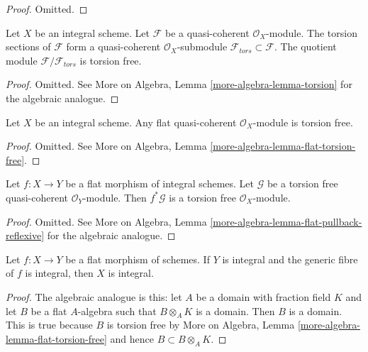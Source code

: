 \begin{proof}
Omitted.
\end{proof}

\begin{lemma}
\label{lemma-torsion}
Let $X$ be an integral scheme. Let $\mathcal{F}$ be a quasi-coherent
$\mathcal{O}_X$-module. The torsion sections of $\mathcal{F}$ form
a quasi-coherent $\mathcal{O}_X$-submodule
$\mathcal{F}_{tors} \subset \mathcal{F}$.
The quotient module $\mathcal{F}/\mathcal{F}_{tors}$ is torsion free.
\end{lemma}

\begin{proof}
Omitted. See More on Algebra, Lemma \ref{more-algebra-lemma-torsion}
for the algebraic analogue.
\end{proof}

\begin{lemma}
\label{lemma-flat-torsion-free}
Let $X$ be an integral scheme. Any flat quasi-coherent $\mathcal{O}_X$-module
is torsion free.
\end{lemma}

\begin{proof}
Omitted. See More on Algebra, Lemma \ref{more-algebra-lemma-flat-torsion-free}.
\end{proof}

\begin{lemma}
\label{lemma-flat-pullback-torsion}
Let $f : X \to Y$ be a flat morphism of integral schemes.
Let $\mathcal{G}$ be a torsion free quasi-coherent $\mathcal{O}_Y$-module.
Then $f^*\mathcal{G}$ is a torsion free $\mathcal{O}_X$-module.
\end{lemma}

\begin{proof}
Omitted. See
More on Algebra, Lemma \ref{more-algebra-lemma-flat-pullback-reflexive}
for the algebraic analogue.
\end{proof}

\begin{lemma}
\label{lemma-flat-over-integral-integral-fibre}
Let $f : X \to Y$ be a flat morphism of schemes. If $Y$ is integral
and the generic fibre of $f$ is integral, then $X$ is integral.
\end{lemma}

\begin{proof}
The algebraic analogue is this: let $A$ be a domain with fraction
field $K$ and let $B$ be a flat $A$-algebra such that $B \otimes_A K$
is a domain. Then $B$ is a domain. This is true because $B$ is
torsion free by More on Algebra, Lemma
\ref{more-algebra-lemma-flat-torsion-free}
and hence $B \subset B \otimes_A K$.
\end{proof}

